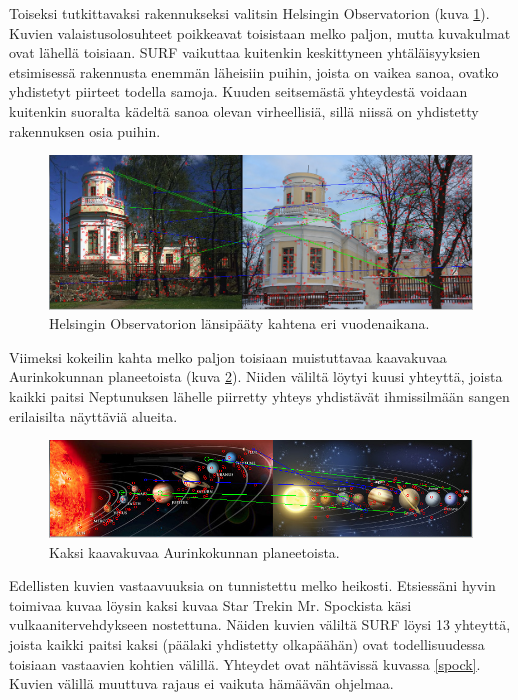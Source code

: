 \documentclass[12pt,a4paper,titlepage]{article}
\begin{document}
Toiseksi tutkittavaksi rakennukseksi valitsin Helsingin Observatorion (kuva \ref{obsis}). Kuvien valaistusolosuhteet poikkeavat toisistaan melko paljon, mutta kuvakulmat ovat lähellä toisiaan. SURF vaikuttaa kuitenkin keskittyneen yhtäläisyyksien etsimisessä rakennusta enemmän läheisiin puihin, joista on vaikea sanoa, ovatko yhdistetyt piirteet todella samoja. Kuuden seitsemästä yhteydestä voidaan kuitenkin suoralta kädeltä sanoa olevan virheellisiä, sillä niissä on yhdistetty rakennuksen osia puihin.

\begin{figure}
\centering 
\includegraphics[width=\textwidth]{kuvat/obsis.jpg}
\caption{Helsingin Observatorion länsipääty kahtena eri vuodenaikana.}
\label{obsis}
\end{figure}

Viimeksi kokeilin kahta melko paljon toisiaan muistuttavaa kaavakuvaa Aurinkokunnan planeetoista (kuva \ref{aurinkokunta}). Niiden väliltä löytyi kuusi yhteyttä, joista kaikki paitsi Neptunuksen lähelle piirretty yhteys yhdistävät ihmissilmään sangen erilaisilta näyttäviä alueita.

\begin{figure}
\centering 
\includegraphics[width=\textwidth]{kuvat/aurinkokunta.jpg}
\caption{Kaksi kaavakuvaa Aurinkokunnan planeetoista.}
\label{aurinkokunta}
\end{figure}

Edellisten kuvien vastaavuuksia on tunnistettu melko heikosti. Etsiessäni hyvin toimivaa kuvaa löysin kaksi kuvaa Star Trekin Mr. Spockista käsi vulkaanitervehdykseen nostettuna. Näiden kuvien väliltä SURF löysi 13 yhteyttä, joista kaikki paitsi kaksi (päälaki yhdistetty olkapäähän) ovat todellisuudessa toisiaan vastaavien kohtien välillä. Yhteydet ovat nähtävissä kuvassa \ref{spock}. Kuvien välillä muuttuva rajaus ei vaikuta hämäävän ohjelmaa.
\end{document}
